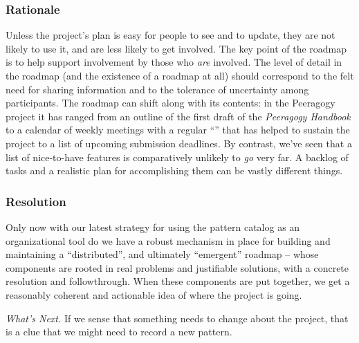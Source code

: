 \subsubsection*{Rationale} Unless the project's plan is easy for people to see and to update, they are not likely to use it, and are less likely to get involved.  The key point of the roadmap is to help support involvement by those who \emph{are} involved.   The level of detail in the roadmap (and the existence of a roadmap at all) should correspond to the felt need for sharing information and to the tolerance of uncertainty among participants.
The roadmap can shift along with its contents: in the Peeragogy
project it has ranged from an outline of the first draft of the
\emph{Peeragogy Handbook} to a calendar of weekly meetings with a
regular ``'' that has helped to sustain the
project to a list of upcoming submission deadlines.  By contrast,
we've seen that a list of nice-to-have features is comparatively
unlikely to \emph{go} very far.  A backlog of tasks and a realistic
plan for accomplishing them can be vastly different things.

\subsubsection*{Resolution}
Only now with our latest strategy for using the pattern catalog as an
organizational tool do we have a robust mechanism in place for
building and maintaining a ``distributed'', and ultimately
``emergent'' roadmap -- whose components are rooted in real problems
and justifiable solutions, with a concrete resolution and
followthrough.  When these components are put together, we get a
reasonably coherent and actionable idea of where the project is going.

\begin{framed}
\emph{What's Next.}
If we sense that something needs to change about the project, that is a clue that we might need to record a new pattern.
\end{framed}


    
    
    
    
    
    
    
    
    
